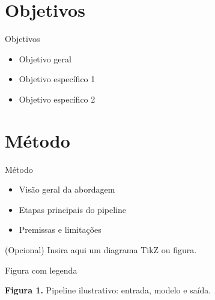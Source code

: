\documentclass[aspectratio=169, 11pt, brazil]{beamer}
\begin{document}
\section{Objetivos}

\begin{frame}{Objetivos}
  \begin{itemize}
    \item Objetivo geral
    \item Objetivo específico 1
    \item Objetivo específico 2
  \end{itemize}
\end{frame}

\section{Método}

\begin{frame}{Método}
  \begin{itemize}
    \item Visão geral da abordagem
    \item Etapas principais do pipeline
    \item Premissas e limitações
  \end{itemize}

  \vspace{0.8em}
  \centering
  {\footnotesize\textcolor{icompMidGray}{%
    (Opcional) Insira aqui um diagrama TikZ ou figura.}}
\end{frame}

\begin{frame}{Figura com legenda}
  \centering

  \vspace{0.7em}
  {\footnotesize\textcolor{icompDarkGray}{%
    \textbf{Figura 1.} Pipeline ilustrativo: entrada, modelo e saída.}}
\end{frame}
\end{document}
